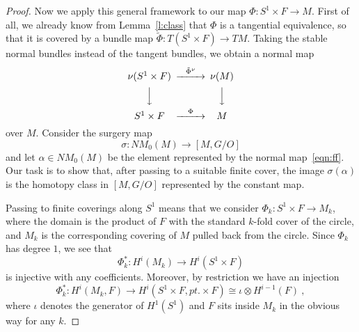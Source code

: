 \documentclass[12pt]{amsart}
\theoremstyle{definition}
\theoremstyle{remark}
\def\ra{{\rightarrow}}
\def\lra{{\longrightarrow}}
\begin{document}
\begin{proof}
Now we apply this general framework to our
map $\Phi\colon S^1\times F \to M$.
First of all, we already know from Lemma~\ref{l:class} that $\Phi$ is a
tangential equivalence, so that it is covered by a bundle
map $\tilde\Phi\colon T(S^1\times F)\ra TM$. Taking the stable
normal bundles instead of the tangent bundles, we obtain
a normal map
\begin{equation}
\begin{CD}
\nu(S^1\times F) @>{\tilde \Phi^{\nu}}>> \nu(M)\\
@VVV @VVV\\
S^1\times F @>{\Phi}>> M
\end{CD}
\label{eqn:ff}
\end{equation}
over $M$.
Consider the surgery map
$$
\sigma\colon NM_0(M)\lra [M, G/O]
$$
and let $\alpha\in NM_0(M)$ be the element represented
by the normal map~\eqref{eqn:ff}.
Our task is to show that, after passing to a suitable
finite cover, the image $\sigma(\alpha)$ is the
homotopy class in $[M, G/O]$ represented by
the constant map.

Passing to finite coverings along $S^1$ means that we consider
$\Phi_k\colon S^1 \times F \longrightarrow M_k$, where the domain is
the product of $F$ with the standard $k$-fold cover of the circle, and $M_k$
is the corresponding covering of $M$ pulled back from the circle.
Since $\Phi_k$ has degree $1$, we see that
$$
\Phi_k^*\colon H^i(M_k) \longrightarrow H^i(S^1 \times F)
$$
is injective with any coefficients. Moreover, by restriction we have an injection
$$ 
\Phi_k^*\colon H^i(M_k,F) \longrightarrow H^i(S^1 \times F, pt. \times F)\cong \iota\otimes H^{i-1}(F)  \ , 
$$
where $\iota$ denotes the generator of $H^1(S^1)$ and $F$ sits inside $M_k$ in the obvious way
for any $k$.






\end{proof}
\end{document}
